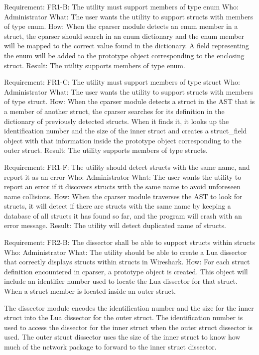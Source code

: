 Requirement: FR1-B: The utility must support members of type enum
Who: Administrator
What: The user wants the utility to support structs with members of type enum.
How: When the cparser module detects an enum member in a struct, the cparser should search in an enum dictionary and the enum member will be mapped to the correct value found in the dictionary. A field representing the enum will be added to the prototype object corresponding to the enclosing struct.
Result: The utility supports members of type enum.

Requirement: FR1-C: The utility must support members of type struct
Who: Administrator
What: The user wants the utility to support structs with members of type struct. 
How: When the cparser module detects a struct in the AST that is a member of another struct, the cparser searches for its definition in the dictionary of previously detected structs. When it finds it, it looks up the identification number and the size of the inner struct and creates a struct\_field object with that information inside the prototype object corresponding to the outer struct.
Result: The utility supports members of type structs.

Requirement: FR1-F: The utility should detect structs with the same name, and report it as an error
Who: Administrator
What: The user wants the utility to report an error if it discovers structs with the same name to avoid unforeseen name collisions.
How: When the cparser module traverses the AST to look for structs, it will detect if there are structs with the same name by keeping a database of all structs it has found so far, and the program will crash with an error message.
Result: The utility will detect duplicated name of structs.

Requirement: FR2-B: The dissector shall be able to support structs within structs
Who: Administrator
What: The utility should be able to create a Lua dissector that correctly displays structs within structs in Wireshark. 
How: For each struct definition encountered in cparser, a prototype object is created. This object will include an identifier number used to locate the Lua dissector for that struct. When a struct member is located inside an outer struct. 

The dissector module encodes the identification number and the size for the inner struct into the Lua dissector for the outer struct. The identification number is used to access the dissector for the inner struct when the outer struct dissector is used. The outer struct dissector uses the size of the inner struct to know how much of the network package to forward to the inner struct dissector.

